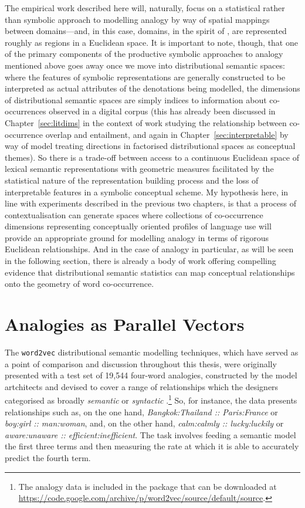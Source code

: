 The empirical work described here will, naturally, focus on a statistical rather than symbolic approach to modelling analogy by way of spatial mappings between domains---and, in this case, domains, in the spirit of \cite{Gardenfors2000}, are represented roughly as regions in a Euclidean space.  It is important to note, though, that one of the primary components of the productive symbolic approaches to analogy mentioned above goes away once we move into distributional semantic spaces: where the features of symbolic representations are generally constructed to be interpreted as actual attributes of the denotations being modelled, the dimensions of distributional semantic spaces are simply indices to information about co-occurrences observed in a digital corpus (this has already been discussed in Chapter~\ref{sec:litdims} in the context of  work studying the relationship between co-occurrence overlap and entailment, and again in Chapter~\ref{sec:interpretable} by way of  model treating directions in factorised distributional spaces as conceptual themes).  So there is a trade-off between access to a continuous Euclidean space of lexical semantic representations with geometric measures facilitated by the statistical nature of the representation building process and the loss of interpretable features in a symbolic conceptual scheme.  My hypothesis here, in line with experiments described in the previous two chapters, is that a process of contextualisation can generate spaces where collections of co-occurrence dimensions representing conceptually oriented profiles of language use will provide an appropriate ground for modelling analogy in terms of rigorous Euclidean relationships.  And in the case of analogy in particular, as will be seen in the following section, there is already a body of work offering compelling evidence that distributional semantic statistics can map conceptual relationships onto the geometry of word co-occurrence.

\section{Analogies as Parallel Vectors} \label{sec:parallel}
The \texttt{word2vec} distributional semantic modelling techniques, which have served as a point of comparison and discussion throughout this thesis, were originally presented with a test set of 19,544 four-word analogies, constructed by the model artchitects and devised to cover a range of relationships which the designers categorised as broadly \emph{semantic} or \emph{syntactic} \citep{MikolovEA2013b,MikolovEA2013c}.\footnote{The analogy data is included in the package that can be downloaded at \url{https://code.google.com/archive/p/word2vec/source/default/source}.}  So, for instance, the data presents relationships such as, on the one hand, \emph{Bangkok:Thailand :: Paris:France} or \emph{boy:girl :: man:woman}, and, on the other hand, \emph{calm:calmly :: lucky:luckily} or \emph{aware:unaware :: efficient:inefficient}.  The task involves feeding a semantic model the first three terms and then measuring the rate at which it is able to accurately predict the fourth term.

